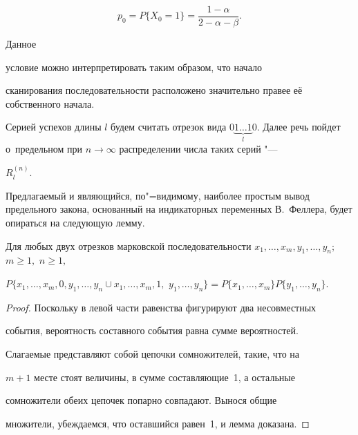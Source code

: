 $$p_0 =P \{X_0 =1\}=\frac{1-\alpha }{2-\alpha -\beta }.$$ 

Данное

условие можно интерпретировать таким образом, что начало

сканирования последовательности расположено значительно правее её собственного начала. 

Серией успехов длины $l$ будем считать отрезок вида $0\underbrace {1\ldots 1}_l0$. Далее речь пойдет о~предельном при $n\to \infty $ распределении числа таких серий "---

$R_l^{(n)}$.



Предлагаемый и являющийся, по"=видимому, наиболее простым вывод предельного закона, основанный на индикаторных переменных В.~Феллера, будет опираться на следующую лемму.

\smallskip



\begin{lemma} Для любых двух отрезков марковской последовательности \linebreak $x_1

,\ldots,x_m ,y_1 ,\ldots, y_n;$ $ m\ge 1,$ $n\ge 1,$ 

$P \{ x_1 ,\ldots ,x_m ,0,y_1 ,\ldots,y_n \cup x_1 ,\ldots,x_m, 1,$ $y_1

,\ldots,y_n \}=P \{ x_1 ,\ldots,x_m\}P\{y_1 ,\ldots,y_n \}.$

\end{lemma}



\smallskip



\begin{proof}

Поскольку в левой части равенства фигурируют два несовместных

события, вероятность составного события равна сумме вероятностей.

Слагаемые представляют собой цепочки сомножителей, такие, что на

$m+1$ месте стоят величины, в сумме составляющие~1, а остальные

сомножители обеих цепочек попарно совпадают. Вынося общие

множители, убеждаемся, что оставшийся равен~1, и лемма доказана.

\end{proof}



\smallskip



